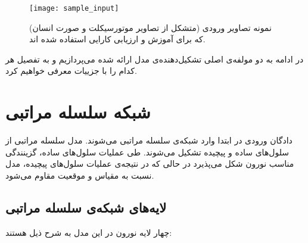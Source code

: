 \begin{figure}
\centering
{\footnotesize
\texttt{[image: sample\_input]}
\caption[نمونه تصاویر ورودی]{نمونه تصاویر ورودی (متشکل از تصاویر موتورسیکلت و صورت انسان) که برای آموزش و ارزیابی کارایی استفاده شده اند.}
\label{fig:sample_input}
}
\end{figure}

در ادامه به دو مولفه‌ی اصلی تشکیل‌دهنده‌ی مدل ارائه شده می‌پردازیم و به تفصیل هر کدام را با جزییات معرفی خواهیم کرد.

\section{شبکه سلسله مراتبی}
دادگان ورودی در ابتدا وارد شبکه‌ی سلسله مراتبی می‌شوند. مدل سلسله مراتبی از سلول‌های ساده و پیچیده تشکیل می‌شوند. طی عملیات سلول‌های ساده، گزینندگی مناسب نورون شکل می‌پذیرد در حالی که در نتیجه‌ی عملیات سلول‌های پیچیده، مدل نسبت به مقیاس و موقعیت مقاوم می‌شود. 

\subsection{لایه‌های شبکه‌ی سلسله مراتبی}
چهار لایه نورون در این مدل به شرح ذیل هستند:


